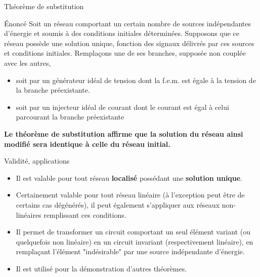 \begin{frame}{Théorème de substitution}

\begin{block}{\'Enoncé}
Soit un réseau comportant un certain nombre de sources indépendantes d'énergie et
soumis à des conditions initiales déterminées. Supposons que ce réseau possède une solution unique, fonction des signaux délivrés par ces sources et conditions initiales. Remplaçons une de ses branches, supposée non couplée avec les autres, 
\begin{itemize}
	\item soit par un générateur idéal de tension dont la f.e.m. est égale à la tension de la branche préexistante.
	\item soit par un injecteur idéal de courant dont le courant est égal à celui parcourant la branche préexistante
\end{itemize}

\textbf{Le théorème de substitution affirme que la solution du réseau ainsi modifié sera identique à celle du réseau initial.}
\end{block}

\end{frame}




\begin{frame}{Validité, applications}
\begin{itemize}
\item Il est valable pour tout réseau \textbf{localisé} possédant une \textbf{solution unique}.
\item Certainement valable pour tout réseau linéaire (à l'exception peut être de certains cas
dégénérés), il peut également s'appliquer aux réseaux non-linéaires remplissant ces conditions.
\item Il permet de transformer un circuit comportant un seul élément variant
(ou quelquefois non linéaire) en un circuit invariant (respectivement linéaire), en remplaçant l'élément "indésirable" par une source indépendante d'énergie. 	
\item Il est utilisé pour la démonstration d'autres théorèmes.
\end{itemize}
\end{frame}


